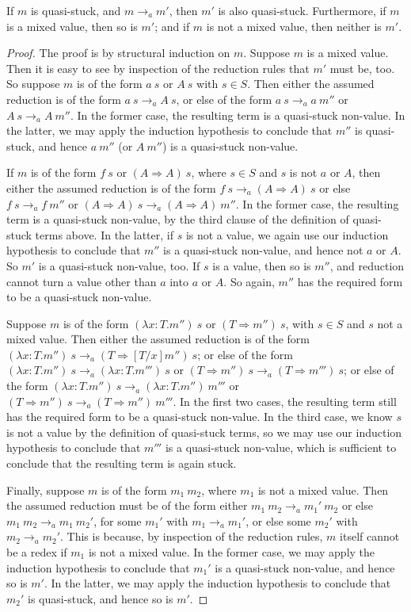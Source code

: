 \documentclass{LMCS}
\newcommand{\To}[0]{\Rightarrow}
\begin{document}
\begin{lem}
\label{lem:redqs}
If $m$ is quasi-stuck, and $m\to_a m'$, then $m'$ is also quasi-stuck.
Furthermore, if $m$ is a mixed value, then so is $m'$; and if $m$ is
not a mixed value, then neither is $m'$.
\end{lem}
\begin{proof}
The proof is by structural induction on
$m$.  Suppose $m$ is a mixed value.  Then it is easy to see by
inspection of the reduction rules that $m'$ must be, too.  So suppose
$m$ is of the form $a\ s$ or $A\ s$ with $s\in S$.  Then either the
assumed reduction is of the form $a\ s\to_a A\ s$, or else of the form
$a\ s\to_a a\ m''$ or $A\ s\to_a A\ m''$.  In the former case, the
resulting term is a quasi-stuck non-value.  In the latter, we may
apply the induction hypothesis to conclude that $m''$ is quasi-stuck,
and hence $a\ m''$ (or $A\ m''$) is a quasi-stuck non-value.

If $m$ is of the form $f\ s$ or $(A\To A)\ s$, where $s\in S$ and $s$
is not $a$ or $A$, then either the assumed reduction is of the form
$f\ s\to_a (A\To A)\ s$ or else $f\ s\to_a f\ m''$ or $(A\To
A)\ s\to_a (A\To A)\ m''$.  In the former case, the resulting term is
a quasi-stuck non-value, by the third clause of the definition of
quasi-stuck terms above.  In the latter, if $s$ is not a value, we
again use our induction hypothesis to conclude that $m''$ is a
quasi-stuck non-value, and hence not $a$ or $A$.  So $m'$ is a
quasi-stuck non-value, too.  If $s$ is a value, then so is $m''$, and
reduction cannot turn a value other than $a$ into $a$ or $A$.  So
again, $m''$ has the required form to be a quasi-stuck non-value.

Suppose $m$ is of the form $(\lambda x:T.m'')\ s$ or $(T\To m'')\ s$,
with $s\in S$ and $s$ not a mixed value.  Then either the assumed
reduction is of the form $(\lambda x:T.m'')\ s\to_a
(T\To[T/x]m'')\ s$; or else of the form $(\lambda x:T. m'')\ s\to_a
(\lambda x:T. m''')\ s$ or $(T\To m'')\ s\to_a (T\To m''')\ s$; or
else of the form $(\lambda x:T. m'')\ s\to_a (\lambda x:T. m'')\ m'''$
or $(T\To m'')\ s\to_a (T\To m'')\ m'''$.  In the first two cases, the
resulting term still has the required form to be a quasi-stuck
non-value.  In the third case, we know $s$ is not a value by the
definition of quasi-stuck terms, so we may use our induction
hypothesis to conclude that $m'''$ is a quasi-stuck non-value, which
is sufficient to conclude that the resulting term is again stuck.

Finally, suppose $m$ is of the form $m_1\ m_2$, where $m_1$ is not a
mixed value.  Then the assumed reduction must be of the form either
$m_1\ m_2\to_a m_1'\ m_2$ or else $m_1\ m_2\to_a m_1\ m_2'$, for some
$m_1'$ with $m_1\to_a m_1'$, or else some $m_2'$ with $m_2 \to_a
m_2'$.  This is because, by inspection of the reduction rules, $m$
itself cannot be a redex if $m_1$ is not a mixed value.  In the former
case, we may apply the induction hypothesis to conclude that $m_1'$
is a quasi-stuck non-value, and hence so is $m'$.  In the latter,
we may apply the induction hypothesis to conclude that $m_2'$ is quasi-stuck,
and hence so is $m'$. 
\end{proof}
\end{document}
